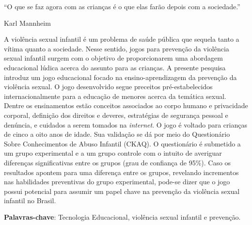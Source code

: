 \begin{epigrafe}	
``O que se faz agora com as crianças é o que elas farão depois com a sociedade.''
\\
\par
Karl Mannheim
\end{epigrafe}


\begin{resumo}

A violência sexual infantil é um problema de saúde pública que sequela tanto a vítima quanto a sociedade. Nesse sentido, jogos para prevenção da violência sexual infantil surgem com o objetivo de proporcionarem uma abordagem educacional lúdica acerca do assunto para as crianças. A presente pesquisa introduz um jogo educacional focado na ensino-aprendizagem da prevenção da violência sexual. O jogo desenvolvido segue preceitos pré-estabelecidos internacionalmente para a educação de menores acerca da temática sexual. Dentre os ensinamentos estão conceitos associados ao corpo humano e privacidade corporal, definição dos direitos e deveres, estratégias de segurança pessoal e denúncia, e cuidados a serem tomados na \textit{internet}. O jogo é voltado para crianças de cinco a oito anos de idade. Sua validação se dá por meio do Questionário Sobre Conhecimentos de Abuso Infantil (CKAQ). O questionário é submetido a um grupo experimental e a um grupo controle com o intuito de averiguar diferenças significativas entre os grupos (grau de confiança de 95\%). Caso os resultados apontem para uma diferença entre os grupos, revelando incrementos nas habilidades preventivas do grupo experimental, pode-se dizer que o jogo possui potencial para assumir um papel chave na prevenção da violência sexual infantil no Brasil.

 \vspace{\onelineskip}
    
 \noindent
 \textbf{Palavras-chave}: Tecnologia Educacional, violência sexual infantil e prevenção.
\end{resumo}

